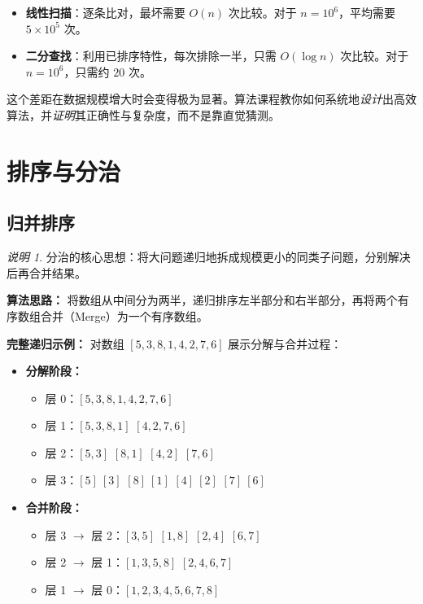 \documentclass[UTF8,openany,12pt]{ctexbook}
\theoremstyle{remark}
\newtheorem{remark}{说明}[chapter]
\begin{document}
\begin{itemize}
  \item \textbf{线性扫描}：逐条比对，最坏需要 $O(n)$ 次比较。对于 $n = 10^6$，平均需要 $5 \times 10^5$ 次。
  \item \textbf{二分查找}：利用已排序特性，每次排除一半，只需 $O(\log n)$ 次比较。对于 $n = 10^6$，只需约 $20$ 次。
\end{itemize}

这个差距在数据规模增大时会变得极为显著。算法课程教你如何系统地\emph{设计}出高效算法，并\emph{证明}其正确性与复杂度，而不是靠直觉猜测。

\section{排序与分治}

\subsection{归并排序}

\begin{remark}
分治的核心思想：将大问题递归地拆成规模更小的同类子问题，分别解决后再合并结果。
\end{remark}

\textbf{算法思路：} 将数组从中间分为两半，递归排序左半部分和右半部分，再将两个有序数组合并（Merge）为一个有序数组。

\textbf{完整递归示例：} 对数组 $[5,3,8,1,4,2,7,6]$ 展示分解与合并过程：

\begin{itemize}
  \item \textbf{分解阶段：}
  \begin{itemize}
    \item 层 0：$[5,3,8,1,4,2,7,6]$
    \item 层 1：$[5,3,8,1]$ \quad $[4,2,7,6]$
    \item 层 2：$[5,3]$ \quad $[8,1]$ \quad $[4,2]$ \quad $[7,6]$
    \item 层 3：$[5]\ [3]$ \quad $[8]\ [1]$ \quad $[4]\ [2]$ \quad $[7]\ [6]$
  \end{itemize}
  \item \textbf{合并阶段：}
  \begin{itemize}
    \item 层 3 $\to$ 层 2：$[3,5]$ \quad $[1,8]$ \quad $[2,4]$ \quad $[6,7]$
    \item 层 2 $\to$ 层 1：$[1,3,5,8]$ \quad $[2,4,6,7]$
    \item 层 1 $\to$ 层 0：$[1,2,3,4,5,6,7,8]$
  \end{itemize}
\end{itemize}
\end{document}
